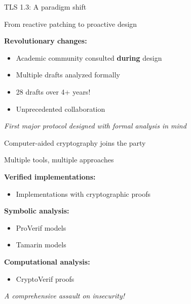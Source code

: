 \documentclass[aspectratio=169, lualatex, handout]{beamer}
\begin{document}
\begin{frame}{TLS 1.3: A paradigm shift}
	\begin{center}
		\Large
		From reactive patching to proactive design
	\end{center}
	\vspace{1em}
	\textbf{Revolutionary changes:}
	\begin{itemize}
		\item Academic community consulted \textbf{during} design
		\item Multiple drafts analyzed formally
		\item 28 drafts over 4+ years!
		\item Unprecedented collaboration
	\end{itemize}
	\vspace{0.5em}
	\begin{center}
		\textit{First major protocol designed with formal analysis in mind}
	\end{center}
\end{frame}

\begin{frame}{Computer-aided cryptography joins the party}
	\begin{center}
		\Large
		Multiple tools, multiple approaches
	\end{center}
	\vspace{1em}
	\textbf{Verified implementations:}
	\begin{itemize}
		\item Implementations with cryptographic proofs
	\end{itemize}
	\vspace{0.5em}
	\textbf{Symbolic analysis:}
	\begin{itemize}
		\item ProVerif models
		\item Tamarin models
	\end{itemize}
	\vspace{0.5em}
	\textbf{Computational analysis:}
	\begin{itemize}
		\item CryptoVerif proofs
	\end{itemize}
	\vspace{0.5em}
	\begin{center}
		\textit{A comprehensive assault on insecurity!}
	\end{center}
\end{frame}
\end{document}
